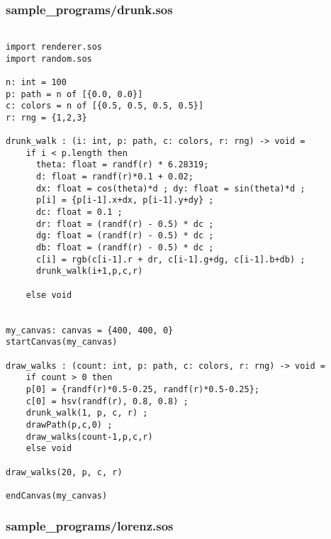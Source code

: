 \documentclass[main.tex]{subfiles}
\begin{document}
\subsubsection{sample\_programs/drunk.sos}

\begin{lstlisting}

import renderer.sos
import random.sos

n: int = 100
p: path = n of [{0.0, 0.0}]
c: colors = n of [{0.5, 0.5, 0.5, 0.5}]
r: rng = {1,2,3}

drunk_walk : (i: int, p: path, c: colors, r: rng) -> void = 
    if i < p.length then
      theta: float = randf(r) * 6.28319;
      d: float = randf(r)*0.1 + 0.02;
      dx: float = cos(theta)*d ; dy: float = sin(theta)*d ;
      p[i] = {p[i-1].x+dx, p[i-1].y+dy} ;
      dc: float = 0.1 ; 
      dr: float = (randf(r) - 0.5) * dc ;
      dg: float = (randf(r) - 0.5) * dc ;
      db: float = (randf(r) - 0.5) * dc ;
      c[i] = rgb(c[i-1].r + dr, c[i-1].g+dg, c[i-1].b+db) ;
      drunk_walk(i+1,p,c,r)

    else void


my_canvas: canvas = {400, 400, 0}
startCanvas(my_canvas)

draw_walks : (count: int, p: path, c: colors, r: rng) -> void =
    if count > 0 then
    p[0] = {randf(r)*0.5-0.25, randf(r)*0.5-0.25};
    c[0] = hsv(randf(r), 0.8, 0.8) ;
    drunk_walk(1, p, c, r) ;
    drawPath(p,c,0) ;
    draw_walks(count-1,p,c,r)
    else void

draw_walks(20, p, c, r)

endCanvas(my_canvas)

\end{lstlisting}

\subsubsection{sample\_programs/lorenz.sos}
\end{document}

